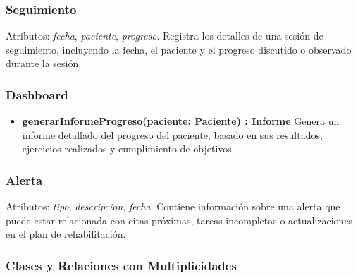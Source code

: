 \documentclass{article}
\begin{document}
\subsubsection*{Seguimiento}
Atributos: \textit{fecha}, \textit{paciente}, \textit{progreso}.  
Registra los detalles de una sesión de seguimiento, incluyendo la fecha, el paciente y el progreso discutido o observado durante la sesión.

\subsubsection*{Dashboard}
\begin{itemize}
	\item \textbf{generarInformeProgreso(paciente: Paciente) : Informe}  
	Genera un informe detallado del progreso del paciente, basado en sus resultados, ejercicios realizados y cumplimiento de objetivos.
\end{itemize}

\subsubsection*{Alerta}
Atributos: \textit{tipo}, \textit{descripcion}, \textit{fecha}.  
Contiene información sobre una alerta que puede estar relacionada con citas próximas, tareas incompletas o actualizaciones en el plan de rehabilitación.

\subsubsection*{Clases y Relaciones con Multiplicidades}
\end{document}
